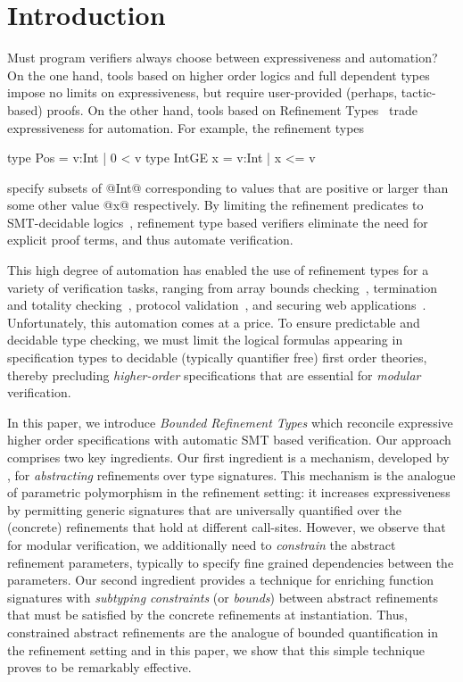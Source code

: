 \section{Introduction} \label{sec:intro}

Must program verifiers always choose between expressiveness
and automation?
%
On the one hand, tools based on higher order logics
and full dependent types impose no limits on expressiveness,
but require user-provided (perhaps, tactic-based) proofs.
%
On the other hand, tools based on Refinement Types~\cite{Rushby98,pfenningxi98}
trade expressiveness for automation. For example, the refinement types
%
\begin{code}
  type Pos     = {v:Int | 0 < v}
  type IntGE x = {v:Int | x <= v}
\end{code}
%
specify subsets of @Int@ corresponding to values
that are positive or larger than some other value @x@
respectively. By limiting the refinement predicates to
SMT-decidable logics~\cite{NelsonOppen}, refinement type
based verifiers eliminate the need for explicit proof terms,
and thus automate verification.


This high degree of automation has enabled the
use of refinement types for a variety of verification
tasks, ranging from array bounds checking~\cite{LiquidPLDI08},
termination and totality checking~\cite{LiquidICFP14},
protocol validation~\cite{GordonTOPLAS2011,FournetCCS11},
and securing web applications~\cite{SwamyOAKLAND11}.
%
Unfortunately, this automation comes at a price.
To ensure predictable and decidable type checking, we must
limit the logical formulas appearing in specification types
to decidable (typically quantifier free) first order theories,
thereby precluding \emph{higher-order} specifications that
are essential for \emph{modular} verification.

In this paper, we introduce \emph{Bounded Refinement Types}
which reconcile expressive higher order specifications
with automatic SMT based verification. Our approach
comprises two key ingredients.
%
Our first ingredient is a mechanism, developed by \cite{vazou13},
for \emph{abstracting} refinements over type signatures.
This mechanism is the analogue of parametric polymorphism
in the refinement setting: it increases expressiveness by
permitting generic signatures that are universally quantified
over the (concrete) refinements that hold at different
call-sites.
%
However, we observe that for modular verification, we
additionally need to \emph{constrain} the abstract refinement
parameters, typically to specify fine grained dependencies
between the parameters.
%
Our second ingredient provides a technique
for enriching function signatures with \emph{subtyping constraints}
(or \emph{bounds}) between abstract refinements that must be
satisfied by the concrete refinements at instantiation.
Thus, constrained abstract refinements are the analogue of bounded
quantification in the refinement setting and in this paper, we
show that this simple technique proves to be remarkably effective.

